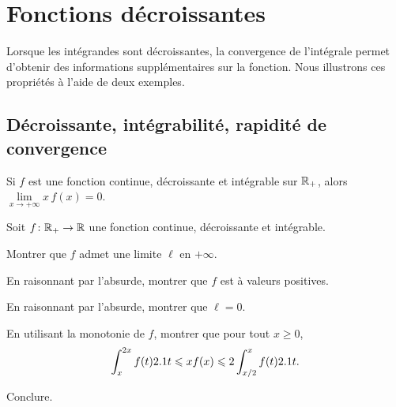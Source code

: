 \section{Fonctions décroissantes}

Lorsque les intégrandes sont décroissantes, la convergence de l'intégrale permet d'obtenir des informations supplémentaires sur la fonction. Nous illustrons ces propriétés à l'aide de deux exemples.

\subsection{Décroissante, intégrabilité, rapidité de convergence}\label{sec:decroissance}

\begin{prop}
Si $f$ est une fonction continue, décroissante et intégrable sur $\R_+$, alors $\lim\limits_{x\to+\infty} x \, f(x) = 0$.
\end{prop}

\begin{exercice}
Soit $\fonctionens[f]{\Rp}{\R}$ une fonction continue, décroissante et intégrable.
\begin{questions}
\item Montrer que $f$ admet une limite $\ell$ en $+\infty$.

\item En raisonnant par l'absurde, montrer que $f$ est à valeurs positives.

\item En raisonnant par l'absurde, montrer que $\ell = 0$.

\item En utilisant la monotonie de $f$, montrer que pour tout $x \geqslant 0$,
\[
\int_x^{2 x} f(t) \d t \leqslant x f(x) \leqslant 2 \int_{x/2}^x f(t) \d t.
\]

\item Conclure.
\end{questions}
\end{exercice}

